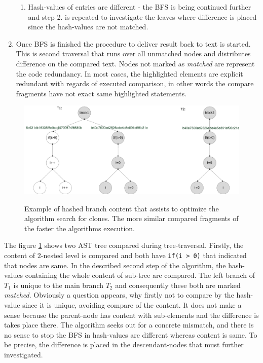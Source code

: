 \documentclass{report}
\begin{document}
\begin{enumerate}
\begin{enumerate}[label*=\arabic*.]
  			\item Hash-values of  entries are different - the BFS is being continued further and step 2. is repeated to investigate the leaves where difference is placed since the hash-values are not matched.
	  \end{enumerate}
  \item Once BFS is finished the procedure to deliver result back to text is started. This is second traversal that runs over all unmatched nodes and distributes difference on the compared text. Nodes not marked as \emph{matched} are represent the code redundancy. In most cases, the highlighted elements are explicit redundant with regards of executed comparison, in other words the compare fragments have not exact same highlighted statements.
\end{enumerate}
\begin{figure}[th]
  \centering
  \includegraphics[scale = 0.5]{Figures/text-to-text/example-of-text-opt.pdf}\\[0.1cm]
  \caption[Example of hashed branch content to optimize the search algorithm]{Example of hashed branch content that assists to optimize the algorithm search for clones. The more similar compared fragments of the faster the algorithms execution.}
  \label{fig:example-of-text-opt}
\end{figure}

The figure \ref{fig:example-of-text-opt} shows two AST tree compared during tree-traversal. Firstly, the content of $2$-nested level is compared and both have
\texttt{if(i > 0)} that indicated that nodes are same. In the described second step of the algorithm, the hash-values containing the whole content of sub-tree are compared. The left branch of $T_{1}$ is unique to the main branch $T_{2}$ and consequently these both are marked \emph{matched}. Obviously a question appears, why firstly not to compare by the hash-value since it is unique, avoiding compare of the content. It does not make a sense because the parent-node has content with sub-elements and the difference is takes place there. The algorithm seeks out for a concrete mismatch, and there is no sense to stop the BFS in hash-values are different whereas content is same. To be precise, the difference is placed in the descendant-nodes that must further investigated.
\end{document}
